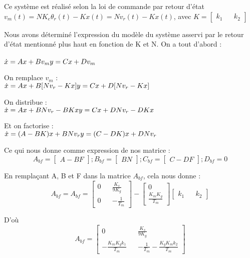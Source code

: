\par Ce système est réalisé selon la loi de commande par retour d'état $v_m(t)=NK_e\theta_r(t)-Kx(t)=Nv_r(t)-Kx(t)$, avec $K=\begin{bmatrix}k_1 && k_2\end{bmatrix}$\\
\par Nous avons déterminé l'expression du modèle du système asservi par le retour d'état mentionné plus haut en fonction de K et N. On a tout d'abord :\\
~~\\
$\dot{x}=Ax+Bv_m \\ y=Cx+Dv_m$\\
\par On remplace $v_m$ :\\
$\dot{x}=Ax+B[Nv_r-Kx] \\ y=Cx+D[Nv_r-Kx]$\\
\par On distribue :\\
$\dot{x}=Ax+BNv_r-BKx \\ y=Cx+DNv_r-DKx$\\
\par Et on factorise :\\
$\dot{x}=(A-BK)x+BNv_r \\ y=(C-DK)x+DNv_r$\\
\par Ce qui nous donne comme expression de nos matrice :\\
$$A_{bf}=\begin{bmatrix}A-BF\end{bmatrix} ; B_{bf}=\begin{bmatrix}BN\end{bmatrix} ; C_{bf}=\begin{bmatrix}C-DF\end{bmatrix} ; D_{bf}=0$$
\par En remplaçant A, B et F dans la matrice $A_{bf}$, cela nous donne :
$$A_{bf}=A_{bf}=\begin{bmatrix}0 && \frac{K_s}{9K_g} \\ 0 && -\frac{1}{T_m}\end{bmatrix}-\begin{bmatrix}0 \\ \frac{K_mK_g}{T_m}\end{bmatrix}\begin{bmatrix}k_1 && k_2\end{bmatrix}$$
\par D'où $$A_{bf}=\begin{bmatrix}0 && \frac{K_s}{9K_g} \\ -\frac{K_mK_gk_1}{T_m} && -\frac{1}{T_m}-\frac{K_gK_mk_2}{T_m}\end{bmatrix}$$\\
